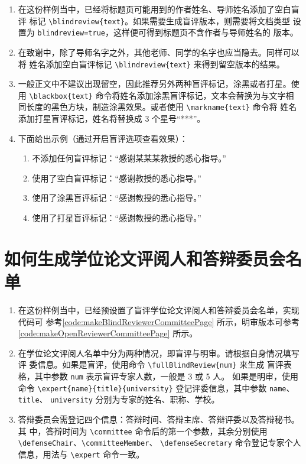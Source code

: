 \documentclass[lang=chs, degree=phd, blindreview=false, winfonts=true]{ya-npu/yanputhesis}
\theoremstyle{plain}%
\theoremstyle{remark}%
\begin{document}
\begin{enumerate}
    \setlength{\itemsep}{0pt}
    \item 在这份样例当中，已经将标题页可能用到的作者姓名、导师姓名添加了空白盲评
          标记 \lstinline`\blindreview{text}`。如果需要生成盲评版本，则需要将文档类型
          设置为 \lstinline`blindreview=true`，这样便可得到标题页不含作者与导师姓名的
          版本。
    \item 在致谢中，除了导师名字之外，其他老师、同学的名字也应当隐去。同样可以将
          姓名添加空白盲评标记 \lstinline`\blindreview{text}` 来得到留空版本的结果。
    \item 一般正文中不建议出现留空，因此推荐另外两种盲评标记，涂黑或者打星。使用
          \lstinline`\blackbox{text}` 命令将姓名添加涂黑盲评标记，文本会替换为与文字相
          同长度的黑色方块，制造涂黑效果。或者使用 \lstinline`\markname{text}` 命令将
          姓名添加打星盲评标记，姓名将替换成 3 个星号“***”。
    \item 下面给出示例（通过开启盲评选项查看效果）：
          \begin{enumerate}
              \setlength{\itemsep}{0pt}
              \item 不添加任何盲评标记：“感谢某某某教授的悉心指导。”
              \item 使用了空白盲评标记：“感谢教授的悉心指导。”
              \item 使用了涂黑盲评标记：“感谢教授的悉心指导。”
              \item 使用了打星盲评标记：“感谢教授的悉心指导。”
          \end{enumerate}
\end{enumerate}

\section{如何生成学位论文评阅人和答辩委员会名单}

\begin{enumerate}
    \setlength{\itemsep}{0pt}
    \item 在这份样例当中，已经预设置了盲评学位论文评阅人和答辩委员会名单，实现代码可
          参考\autoref{code:makeBlindReviewerCommitteePage} 所示，明审版本可参考
          \autoref{code:makeOpenReviewerCommitteePage} 所示。
    \item 在学位论文评阅人名单中分为两种情况，即盲评与明审。请根据自身情况填写评
          委信息。如果是盲评，使用命令 \lstinline`\fullBlindReview{num}` 来生成
          盲评表格，其中参数 \lstinline`num` 表示盲评专家人数，一般是 3 或 5 人。
          如果是明审，使用命令 \lstinline`\expert{name}{title}{university}`
          登记评委信息，其中参数 \lstinline`name`、\lstinline`title`、
          \lstinline`university` 分别为专家的姓名、职称、学校。
    \item 答辩委员会需登记四个信息：答辩时间、答辩主席、答辩评委以及答辩秘书。其
          中，答辩时间为 \lstinline`\committee` 命令后的第一个参数，其余分别使用
          \lstinline`\defenseChair`、\lstinline`\committeeMember`、
          \lstinline`\defenseSecretary` 命令登记专家个人信息，用法与
          \lstinline`\expert` 命令一致。
\end{enumerate}
\end{document}

